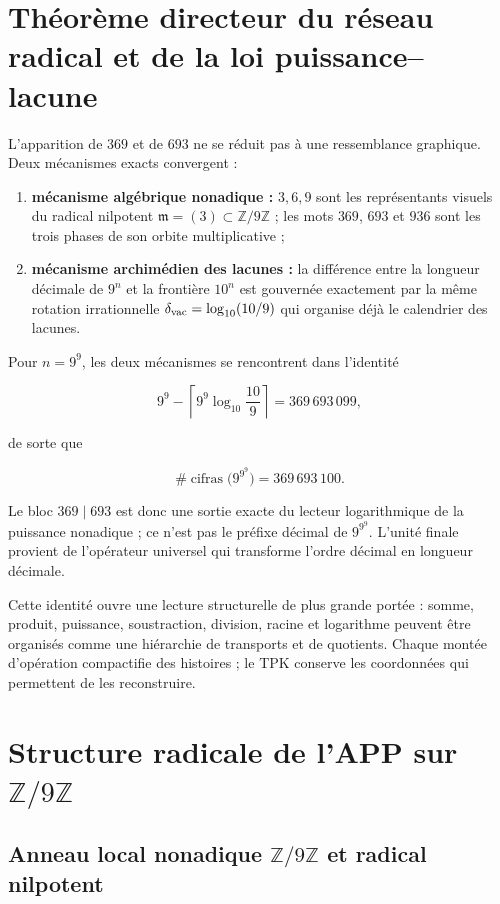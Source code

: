 \section{Théorème directeur du réseau radical et de la loi puissance--lacune}

L’apparition de \(369\) et de \(693\) ne se réduit pas à une ressemblance graphique. Deux mécanismes exacts convergent :

\begin{enumerate}
\item \textbf{mécanisme algébrique nonadique :} \(3,6,9\) sont les représentants visuels du radical nilpotent \(\mathfrak m=(3)\subset\mathbb Z/9\mathbb Z\) ; les mots \(369\), \(693\) et \(936\) sont les trois phases de son orbite multiplicative ;
\item \textbf{mécanisme archimédien des lacunes :} la différence entre la longueur décimale de \(9^n\) et la frontière \(10^n\) est gouvernée exactement par la même rotation irrationnelle \(\delta_{\rm vac}=\log_{10}(10/9)\) qui organise déjà le calendrier des lacunes.
\end{enumerate}

Pour \(n=9^9\), les deux mécanismes se rencontrent dans l’identité

\[
9^9-\left\lceil 9^9\log_{10}\frac{10}{9}\right\rceil
=369\,693\,099,
\]

de sorte que

\[
\#\operatorname{cifras}\bigl(9^{9^9}\bigr)=369\,693\,100.
\]

Le bloc \(369\mid693\) est donc une sortie exacte du lecteur logarithmique de la puissance nonadique ; ce n’est pas le préfixe décimal de \(9^{9^9}\). L’unité finale provient de l’opérateur universel qui transforme l’ordre décimal en longueur décimale.

Cette identité ouvre une lecture structurelle de plus grande portée : somme, produit, puissance, soustraction, division, racine et logarithme peuvent être organisés comme une hiérarchie de transports et de quotients. Chaque montée d’opération compactifie des histoires ; le TPK conserve les coordonnées qui permettent de les reconstruire.


\section{Structure radicale de l’APP sur \(\mathbb Z/9\mathbb Z\)}

\subsection{Anneau local nonadique \(\mathbb Z/9\mathbb Z\) et radical nilpotent}

